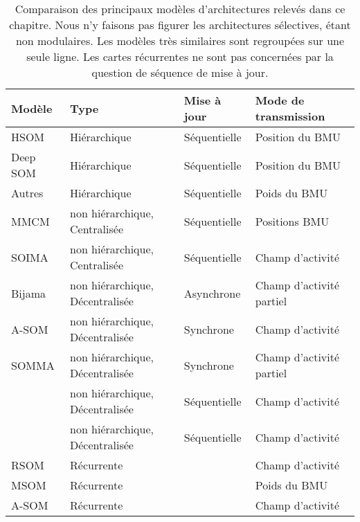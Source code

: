 \documentclass[../main]{subfiles}
\begin{document}
\begin{table}[t!]
    \renewcommand{\arraystretch}{1.5}
    \caption{Comparaison des principaux modèles d'architectures relevés dans ce chapitre. Nous n'y faisons pas figurer les architectures sélectives, étant non modulaires. Les modèles très similaires sont regroupées sur une seule ligne. Les cartes récurrentes ne sont pas concernées par la question de séquence de mise à jour. \label{tab:bib}}
    \vspace{5mm}
    \begin{tabular}{p{2cm}p{6cm}p{2cm}p{5cm}}
        Modèle& Type& Mise à jour& Mode de transmission   \\
        \hline
        HSOM\footnotemark[1]& Hiérarchique & Séquentielle & Position du BMU  \\
        Deep SOM\footnotemark[2] & Hiérarchique & Séquentielle & Position du BMU   \\
        Autres \footnotemark[3] & Hiérarchique & Séquentielle & Poids du BMU \\
        \hline
        MMCM \footnotemark[4] & non hiérarchique, Centralisée & Séquentielle    & Positions BMU    \\                  
        SOIMA\footnotemark[5] & non hiérarchique, Centralisée & Séquentielle    & Champ d'activité \\
        Bijama\footnotemark[6] & non hiérarchique, Décentralisée &   Asynchrone    & Champ d'activité partiel \\ 
        A-SOM  \footnotemark[7] & non hiérarchique, Décentralisée       & Synchrone       & Champ d'activité \\
        SOMMA  \footnotemark[8]          & non hiérarchique, Décentralisée       & Synchrone       & Champ d'activité partiel \\
        \cite{jayaratne_bio-inspired_2018}           & non hiérarchique, Décentralisée       & Séquentielle    & Champ d'activité \\
        \cite{khacef_brain-inspired_2020}            & non hiérarchique, Décentralisée       & Séquentielle    & Champ d'activité \\
        \hline
        RSOM  \footnotemark[9]      & Récurrente                            &                & Champ d'activité \\
        MSOM   \footnotemark[10]& Récurrente                                   &                & Poids du BMU\\
        A-SOM   \footnotemark[11]& Récurrente                            &                & Champ d'activité\\

\end{tabular}
\end{table}
\end{document}
